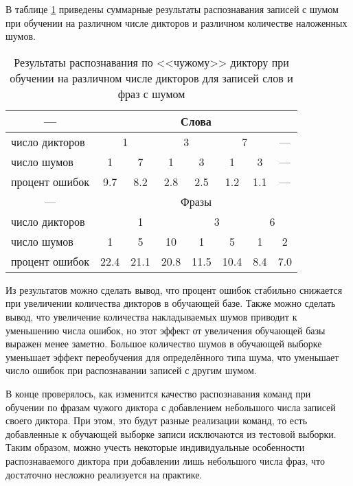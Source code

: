 В таблице \ref{tab:4_2} приведены суммарные результаты распознавания записей с шумом при обучении на различном числе дикторов и различном количестве наложенных шумов.
\begin{table}[h]
	\centering
	\caption{Результаты распознавания по <<чужому>> диктору при обучении на различном числе дикторов для записей слов и фраз с шумом}
	\label{tab:4_2}
	\begin{tabular}{| l | c | c | c | c | c | c | c |}
		\hline
		\multicolumn{1}{|c|}{---} & \multicolumn{7}{c|}{Слова} \\
		\hline
		число дикторов\phantom{0000} & \multicolumn{2}{c|}{1} & \multicolumn{2}{c|}{3} & \multicolumn{2}{c|}{7} & --- \\
		\hline
		число шумов & \phantom{0} 1 \phantom{0} & \phantom{0} 7 \phantom{0} & \phantom{0} 1 \phantom{0} & \phantom{0} 3 \phantom{0} & 1 & 3 & --- \\
		\hline
		процент ошибок & 9.7 & 8.2 & 2.8 & 2.5 & 1.2 & 1.1 & --- \\
		\hline
		\multicolumn{1}{|c|}{---} & \multicolumn{7}{c|}{Фразы} \\
		\hline
		число дикторов & \multicolumn{3}{c|}{1} & \multicolumn{2}{c|}{3} & \multicolumn{2}{c|}{6} \\
		\hline
		число шумов & 1 & 5 & 10 & 1 & \phantom{0} 5 \phantom{0} & \phantom{0} 1 \phantom{0} & \phantom{0} 2 \phantom{0} \\
		\hline
		процент ошибок & 22.4 & 21.1 & 20.8 & 11.5 & 10.4 & 8.4 & 7.0 \\
		\hline
	\end{tabular}
\end{table}

Из результатов можно сделать вывод, что процент ошибок стабильно снижается при увеличении количества дикторов в обучающей базе.
Также можно сделать вывод, что увеличение количества накладываемых шумов приводит к уменьшению числа ошибок, но этот эффект от увеличения обучающей базы выражен менее заметно.
Большое количество шумов в обучающей выборке уменьшает эффект переобучения для определённого типа шума, что уменьшает число ошибок при распознавании записей с другим шумом.

В конце проверялось, как изменится качество распознавания команд при обучении по фразам чужого диктора с добавлением небольшого числа записей своего диктора.
При этом, это будут разные реализации команд, то есть добавленные к обучающей выборке записи исключаются из тестовой выборки.
Таким образом, можно учесть некоторые индивидуальные особенности распознаваемого диктора при добавлении лишь небольшого числа фраз, что достаточно несложно реализуется на практике.

